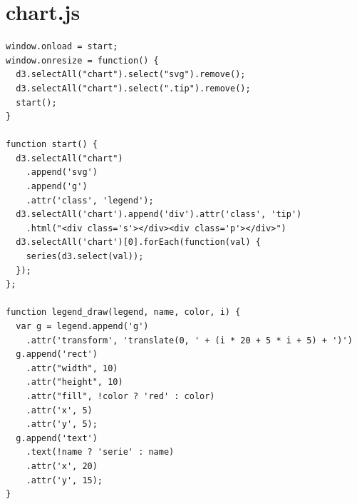 \documentclass[a4paper,14pt]{extreport}
\begin{document}
\section*{chart.js}
\begin{lstlisting}
window.onload = start;
window.onresize = function() {
  d3.selectAll("chart").select("svg").remove();
  d3.selectAll("chart").select(".tip").remove();
  start();
}

function start() {
  d3.selectAll("chart")
    .append('svg')
    .append('g')
    .attr('class', 'legend');
  d3.selectAll('chart').append('div').attr('class', 'tip')
    .html("<div class='s'></div><div class='p'></div>")
  d3.selectAll('chart')[0].forEach(function(val) {
    series(d3.select(val));
  });
};

function legend_draw(legend, name, color, i) {
  var g = legend.append('g')
    .attr('transform', 'translate(0, ' + (i * 20 + 5 * i + 5) + ')')
  g.append('rect')
    .attr("width", 10)
    .attr("height", 10)
    .attr("fill", !color ? 'red' : color)
    .attr('x', 5)
    .attr('y', 5);
  g.append('text')
    .text(!name ? 'serie' : name)
    .attr('x', 20)
    .attr('y', 15);
}


\end{lstlisting}
\end{document}
